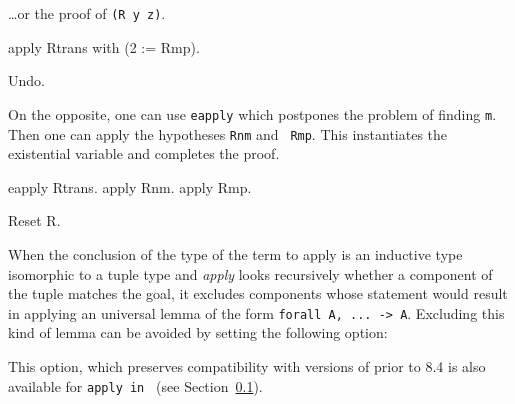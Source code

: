 \ldots or the proof of {\tt (R y z)}.

\begin{coq_example}
apply Rtrans with (2 := Rmp).
\end{coq_example}
\begin{coq_eval}
Undo.
\end{coq_eval}

On the opposite, one can use {\tt eapply} which postpones the problem
of finding {\tt m}. Then one can apply the hypotheses {\tt Rnm} and {\tt
Rmp}. This instantiates the existential variable and completes the proof.

\begin{coq_example}
eapply Rtrans.
apply Rnm.
apply Rmp.
\end{coq_example}

\begin{coq_eval}
Reset R.
\end{coq_eval}

 When the conclusion of the type of the term
to apply is an inductive type isomorphic to a tuple type and {\em apply}
looks recursively whether a component of the tuple matches the goal,
it excludes components whose statement would result in applying an
universal lemma of the form {\tt forall A, ... -> A}. Excluding this
kind of lemma can be avoided by setting the following option:

\begin{quote}
{}
\end{quote}

This option, which preserves compatibility with versions of {\Coq}
prior to 8.4 is also available for {\tt apply {\term} in {\ident}}
(see Section~\ref{apply-in}).

\subsection{}
\label{apply-in}

